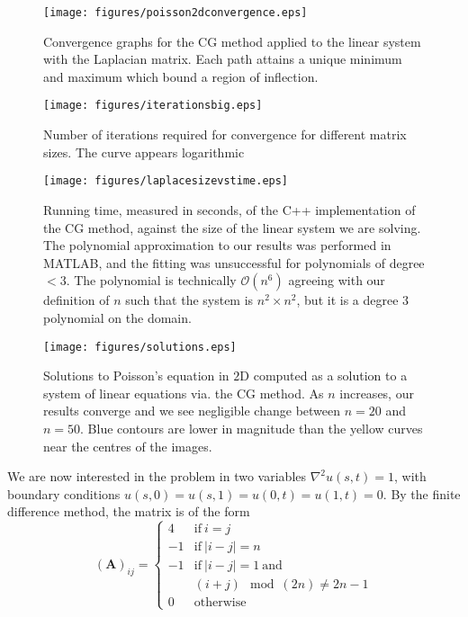 \documentclass{article}
\begin{document}
\begin{figure}
	\centering
	\texttt{[image: figures/poisson2dconvergence.eps]}
	\caption{
		Convergence graphs for the CG method applied to the linear system with the Laplacian matrix.
		Each path attains a unique minimum and maximum which bound a region of inflection.
	}
	\label{fig:2dconv}
\end{figure}
\begin{figure}
	\centering
	\texttt{[image: figures/iterationsbig.eps]}
	\caption{
		Number of iterations required for convergence for different matrix sizes.
		The curve appears logarithmic }
	\label{fig:2diter}
\end{figure}
\begin{figure}
	\centering
	\texttt{[image: figures/laplacesizevstime.eps]}
	\caption{
		Running time, measured in seconds, of the C++ implementation of the CG method,
		against the size of the linear system we are solving.
		The polynomial approximation to our results was performed in MATLAB,
		and the fitting was unsuccessful for polynomials of degree $<3$.
		The polynomial is technically $\mathcal{O}(n^6)$ agreeing with our definition of $n$ such that the system is $n^2 \times n^2$,
		but it is a degree $3$ polynomial on the domain.
	}
	\label{fig:2dtime}
\end{figure}
\begin{figure}
	\centering
	\texttt{[image: figures/solutions.eps]}
	\caption{
		Solutions to Poisson's equation in $2$D computed as a solution to a system of linear equations via. the CG method.
		As $n$ increases, our results converge and we see negligible change between $n=20$ and $n=50$.
		Blue contours are lower in magnitude than the yellow curves near the centres of the images. 
	}
	\label{fig:2dsolns}
\end{figure}
We are now interested in the problem in two variables $\nabla^2 u(s,t) = 1$, with boundary conditions $u(s,0) = u(s,1) = u(0,t) = u(1,t) = 0$.
By the finite difference method, the matrix is of the form
\begin{equation}
	(\mathbf{A})_{ij} = \begin{cases}
		4 & \mathrm{if}~{i=j} \\
		-1 & \mathrm{if}~ |i-j|=n \\
		-1 & \mathrm{if}~ |i-j|=1 ~\mathrm{and} \\ 
		 & (i+j) \mod (2n) \neq 2n-1 \\
		0 & \mathrm{otherwise}
	\end{cases} 
	\label{eqn:lapmat}
\end{equation}
\end{document}

